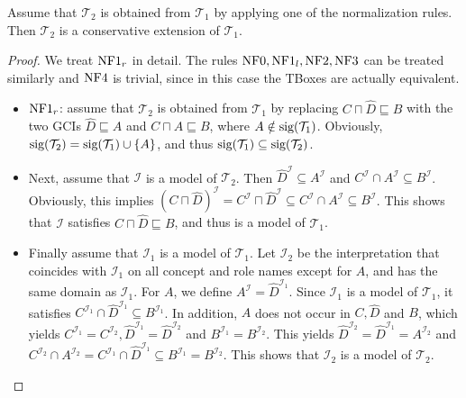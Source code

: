 \begin{prop}
	Assume that $\mathcal{T}_2$ is obtained from $\mathcal{T}_1$ by applying one of the normalization rules.
	Then $\mathcal{T}_2$ is a conservative extension of $\mathcal{T}_1$.
\end{prop}
\begin{proof}
	We treat $\mathit{\text{NF1}}_r$ in detail.
	The rules $\mathit{\text{NF0}}, \mathit{\text{NF1}}_l, \mathit{\text{NF2}}, \mathit{\text{NF3}}$ can be treated similarly and $\mathit{\text{NF4}}$ is trivial,
	since in this case the TBoxes are actually equivalent.
	\begin{itemize}
		\item $\mathit{\text{NF1}}_r$: assume that $\mathcal{T}_2$ is obtained from $\mathcal{T}_1$ by replacing
			$C \sqcap \widehat{D} \sqsubseteq B$ with the two GCIs $\widehat{D} \sqsubseteq A$
			and $C \sqcap A \sqsubseteq B$,
			where $A \notin \operatorname{\text{sig}}(\mathcal{T}_1)$.
			Obviously, $\operatorname{\text{sig}}(\mathcal{T}_2) = \operatorname{\text{sig}}(\mathcal{T}_1) \cup \left\{ A \right\}$,
			and thus $\operatorname{\text{sig}}(\mathcal{T}_1) \subseteq \operatorname{\text{sig}}(\mathcal{T}_2)$.
		\item Next, assume that $\mathcal{I}$ is a model of $\mathcal{T}_2$.
			Then $\widehat{D}^\mathcal{I} \subseteq A^\mathcal{I}$ and $C^\mathcal{I} \cap A^\mathcal{I} \subseteq B^\mathcal{I}$.
			Obviously, this implies 
			$\left( C \sqcap \widehat{D} \right)^\mathcal{I} = C^\mathcal{I} \sqcap \widehat{D}^\mathcal{I} \subseteq C^\mathcal{I} \cap A^\mathcal{I} \subseteq B^\mathcal{I}$.
			This shows that $\mathcal{I}$ satisfies $C \sqcap \widehat{D} \sqsubseteq B$,
			and thus is a model of $\mathcal{T}_1$.
		\item Finally assume that $\mathcal{I}_1$ is a model of $\mathcal{T}_1$.
			Let $\mathcal{I}_2$ be the interpretation that coincides with $\mathcal{I}_1$ 
			on all concept and role names except for $A$,
			and has the same domain as $\mathcal{I}_1$.
			For $A$, we define $A^\mathcal{I} = \widehat{D}^{\mathcal{I}_1}$.
			Since $\mathcal{I}_1$ is a model of $\mathcal{T}_1$, it satisfies $C^{\mathcal{I}_1} \cap \widehat{D}^{\mathcal{I}_1} \subseteq B^{\mathcal{I}_1}$.
			In addition, $A$ does not occur in $C, \widehat{D}$ and $B$,
			which yields $C^{\mathcal{I}_1} = C^{\mathcal{I}_2}, \widehat{D}^{\mathcal{I}_1} = \widehat{D}^{\mathcal{I}_2}$ and $B^{\mathcal{I}_1} = B^{\mathcal{I}_2}$.
			This yields $ \widehat{D}^{\mathcal{I}_2} = \widehat{D}^{\mathcal{I}_1} = A^{\mathcal{I}_2}$
			and $C^{\mathcal{I}_2} \cap A^{\mathcal{I}_2} = C^{\mathcal{I}_1} \cap \widehat{D}^{\mathcal{I}_1} \subseteq B^{\mathcal{I}_1} = B^{\mathcal{I}_2}$.
			This shows that $\mathcal{I}_2$ is a model of $\mathcal{T}_2$.
			\qedhere
	\end{itemize}
\end{proof}

